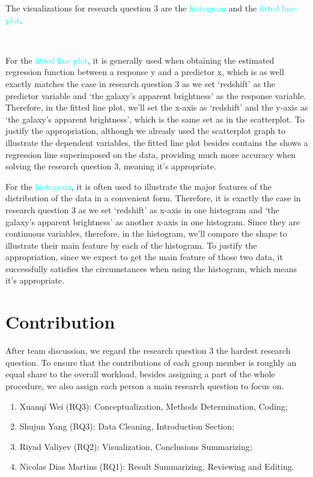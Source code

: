 \documentclass[12pt]{article}
\begin{document}
The visualizations for research question 3 are the \textcolor{cyan}{histogram} and the \textcolor{cyan}{fitted line plot}.

\

\noindent For the \textcolor{cyan}{fitted line plot}, it is generally used when obtaining the estimated regression function between a response y and a predictor x, which is as well exactly matches the case in research question 3 as we set `redshift' as the predictor variable and `the galaxy's apparent brightness' as the response variable. Therefore, in the fitted line plot, we'll set the x-axis as `redshift' and the y-axis as `the galaxy's apparent brightness', which is the same set as in the scatterplot. To justify the appropriation, although we already used the scatterplot graph to illustrate the dependent variables, the fitted line plot besides contains the shows a regression line superimposed on the data, providing much more accuracy when solving the research question 3, meaning it's appropriate. 

\noindent For the \textcolor{cyan}{histogram}, it is often used to illustrate the major features of the distribution of the data in a convenient form. Therefore, it is exactly the case in research question 3 as we set `redshift' as x-axis in one histogram and `the galaxy's apparent brightness' as another x-axis in one histogram. Since they are continuous variables, therefore, in the histogram, we'll compare the shape to illustrate their main feature by each of the histogram. To justify the appropriation, since we expect to get the main feature of those two data, it successfully satisfies the circumstances when using the histogram, which means it's appropriate.


\newpage

\section{Contribution}
After team discussion, we regard the research question 3 the hardest research question. To ensure that the contributions of each group member is roughly an equal share to the overall workload, besides assigning a part of the whole procedure, we also assign each person a main research question to focus on. 

\begin{enumerate}
	\item Xuanqi Wei (RQ3): Conceptualization, Methods Determination, Coding;
	\item Shujun Yang (RQ3): Data Cleaning, Introduction Section;
	\item Riyad Valiyev (RQ2): Visualization, Conclusions Summarizing;
	\item Nicolas Dias Martins (RQ1): Result Summarizing, Reviewing and Editing.
\end{enumerate}
\end{document}
